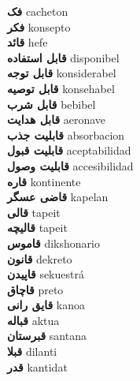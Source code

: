 \textbf{ فک  } cacheton \\
\textbf{ فکر  } konsepto \\
\textbf{ قائد  } hefe \\
\textbf{ قابل استفاده  } disponibel \\
\textbf{ قابل توجه  } konsiderabel \\
\textbf{ قابل توصیه  } konsehabel \\
\textbf{ قابل شرب  } bebibel \\
\textbf{ قابل هدایت  } aeronave \\
\textbf{ قابلیت جذب  } absorbacion \\
\textbf{ قابلیت قبول  } aceptabilidad \\
\textbf{ قابلیت وصول  } accesibilidad \\
\textbf{ قاره  } kontinente \\
\textbf{ قاضی عسگر  } kapelan \\
\textbf{ قالی  } tapeit \\
\textbf{ قالیچه  } tapeit \\
\textbf{ قاموس  } dikshonario \\
\textbf{ قانون  } dekreto \\
\textbf{ قاپیدن  } sekuestrá \\
\textbf{ قاچاق  } preto \\
\textbf{ قایق رانی  } kanoa \\
\textbf{ قباله  } aktua \\
\textbf{ قبرستان  } santana \\
\textbf{ قبلا  } dilanti \\
\textbf{ قدر  } kantidat \\
